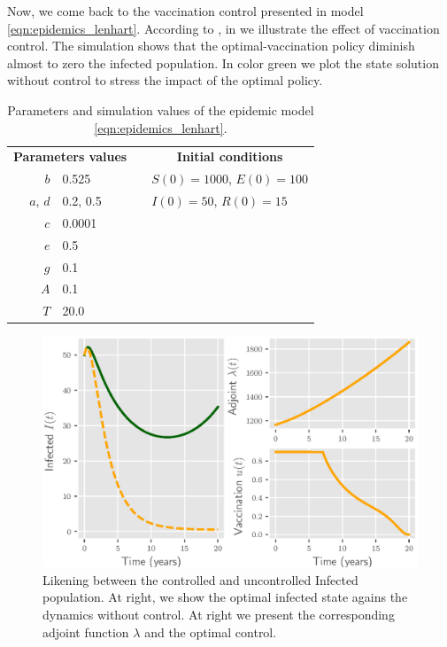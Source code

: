 Now, we come back to the vaccination control presented in model
\eqref{eqn:epidemics_lenhart}. According to ,
in  we illustrate the effect of vaccination 
control. The simulation shows that the optimal-vaccination policy diminish
almost to zero the infected population. In color green we plot the state 
solution without control to stress the impact of the optimal policy.
\begin{table}[H]
  \begin{center}
    \begin{tabular}{rlll}
      \toprule
      \multicolumn{2}{c}{
            \textbf{Parameters values}
         }
        && \multicolumn{1}{c}{
          \textbf{Initial conditions}
        }
        \\
        \cmidrule{1-2}
        \cmidrule{4-4}
        $b$
          & \num{0.525}
          &&
          $S(0) = \num{1000}$, $E(0) = \num{100}$
        \\
        $a$, $d$ 
          & \num{0.2}, \num{0.5}
          &&
          $I(0) = \num{50}$, $R(0) = \num{15}$
        \\
        $c$
          & \num{0.0001}
        \\
        $e$
          & \num{0.5}
        \\
        $g$
          & \num{0.1}
        \\
        $A$
          & \num{0.1}
        \\
        $T$
          & \num{20.0}
        \\
      \bottomrule
    \end{tabular}
    \caption{Parameters and simulation values of the epidemic model
      \eqref{eqn:epidemics_lenhart}.}
    \label{tbl:epidemics_lenhart}
  \end{center}
\end{table}

\begin{figure}[H]
\centering
	\includegraphics{./Figures/epidemics_lenhart_lab7}
	\caption{Likening between the controlled and uncontrolled Infected 
	 population.  At right, we show the optimal infected state agains the 
	 dynamics without 
	 control. At right we present the corresponding adjoint function $\lambda$ 
	 and the optimal control.}
\label{fig:epidemicslenhartlab7}
\end{figure}
